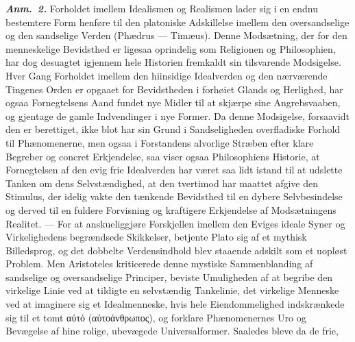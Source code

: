 \documentclass[12pt]{book}
\newcommand{\anm}[1]{\emph{\textbf{Anm.~#1.}}}
\newcommand{\opage}[1]{\marginnote{\footnotesize\textit{[#1]}}}
\begin{document}
\anm{2} Forholdet imellem Idealismen og Realismen lader sig i en endnu bestemtere Form
henføre til den platoniske Adskillelse imellem den oversandselige og den sandselige Verden
(Phædrus --- Timæus). Denne Modsætning, der for den menneskelige Bevidsthed er ligesaa
oprindelig som Religionen og Philosophien, har dog desuagtet igjennem hele Historien
fremkaldt sin tilsvarende Modsigelse. Hver Gang Forholdet imellem den hiinsidige
Idealverden og den nærværende Tingenes Orden er opgaaet for Bevidstheden i forhøiet Glands
og Herlighed, har ogsaa Fornegtelsens Aand fundet nye Midler til at skjærpe sine
Angrebsvaaben, og gjentage de gamle
\opage{187} Indvendinger i nye Former. Da denne Modsigelse, forsaavidt den er berettiget, ikke blot
har sin Grund i Sandseligheden overfladiske Forhold til Phænomenerne, men ogsaa i
Forstandens alvorlige Stræben efter klare Begreber og concret Erkjendelse, saa viser ogsaa
Philosophiens Historie, at Fornegtelsen af den evig frie Idealverden har været saa lidt
istand til at udslette Tanken om dens Selvstændighed, at den tvertimod har maattet afgive
den Stimulus, der idelig vakte den tænkende Bevidsthed til en dybere Selvbesindelse og
derved til en fuldere Forvisning og kraftigere Erkjendelse af Modsætningens Realitet. ---
For at anskueliggjøre Forskjellen imellem den Eviges ideale Syner og Virkelighedens
begrændsede Skikkelser, betjente Plato sig af et mythisk Billedsprog, og det dobbelte
Verdensindhold blev staaende adskilt som et uopløst Problem. Men Aristoteles kriticerede
denne mystiske Sammenblanding af sandselige og oversandselige Principer, beviste
Umuligheden af at begribe den virkelige Linie ved at tildigte en selvstændig Tankelinie,
det virkelige Menneske ved at imaginere sig et Idealmenneske, hvis hele Eiendommelighed
indskrænkede sig til et tomt αὐτό (αὐτοάνθρωπος), og forklare Phænomenernes Uro og
Bevægelse af hine rolige, ubevægede Universalformer. Saaledes bleve da de frie,
\end{document}
